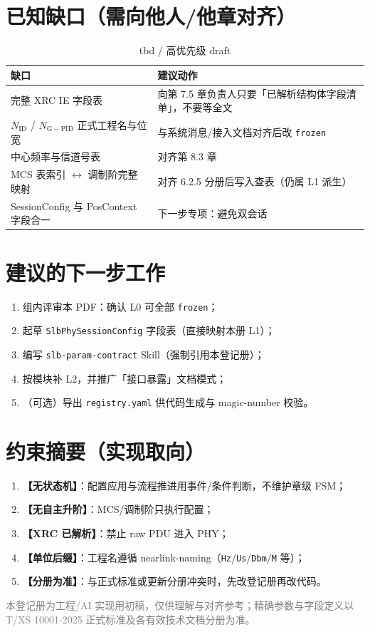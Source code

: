\documentclass[11pt,a4paper]{ctexart}
\begin{document}
\section{已知缺口（需向他人/他章对齐）}

\begin{longtable}{L{4.5cm}L{10.2cm}}
\caption{tbd / 高优先级 draft\label{tab:gap}} \\
\toprule
\textbf{缺口} & \textbf{建议动作} \\
\midrule
完整 XRC IE 字段表 & 向第 7.5 章负责人只要「已解析结构体字段清单」，不要等全文 \\
$N_{\mathrm{ID}}$ / $N_{\mathrm{G-PID}}$ 正式工程名与位宽 & 与系统消息/接入文档对齐后改 \texttt{frozen} \\
中心频率与信道号表 & 对齐第 8.3 章 \\
MCS 表索引 $\leftrightarrow$ 调制阶完整映射 & 对齐 6.2.5 分册后写入查表（仍属 L1 派生） \\
SessionConfig 与 PosContext 字段合一 & 下一步专项：避免双会话 \\
\bottomrule
\end{longtable}

\section{建议的下一步工作}

\begin{enumerate}[nosep]
  \item 组内评审本 PDF：确认 L0 可全部 \texttt{frozen}；
  \item 起草 \texttt{SlbPhySessionConfig} 字段表（直接映射本册 L1）；
  \item 编写 \texttt{slb-param-contract} Skill（强制引用本登记册）；
  \item 按模块补 L2，并推广「接口暴露」文档模式；
  \item （可选）导出 \texttt{registry.yaml} 供代码生成与 magic-number 校验。
\end{enumerate}

\section{约束摘要（实现取向）}

\begin{enumerate}[nosep]
  \item \textbf{【无状态机】}：配置应用与流程推进用事件/条件判断，不维护章级 FSM；
  \item \textbf{【无自主升阶】}：MCS/调制阶只执行配置；
  \item \textbf{【XRC 已解析】}：禁止 raw PDU 进入 PHY；
  \item \textbf{【单位后缀】}：工程名遵循 nearlink-naming（\texttt{Hz}/\texttt{Us}/\texttt{Dbm}/\texttt{M} 等）；
  \item \textbf{【分册为准】}：与正式标准或更新分册冲突时，先改登记册再改代码。
\end{enumerate}

\vspace{1.5em}
{\small\textcolor{gray}{本登记册为工程/AI 实现用初稿，仅供理解与对齐参考；精确参数与字段定义以 T/XS 10001-2025 正式标准及各有效技术文档分册为准。}}
\end{document}
